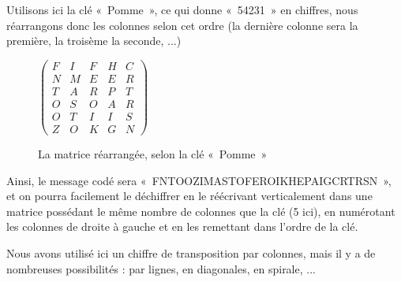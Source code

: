 Utilisons ici la clé «~Pomme~», ce qui donne «~54231~» en chiffres,
nous réarrangons donc les colonnes selon cet ordre (la dernière
colonne sera la première, la troisème la seconde, ...)

\begin{figure}[h]
  \begin{center}
  $
  \left(
    \begin{array}{ccccc}
      F & I & F & H & C \\ 
      N & M & E & E & R \\
      T & A & R & P & T \\
      O & S & O & A & R \\
      O & T & I & I & S \\
      Z & O & K & G & N
    \end{array}
  \right)
  $
  \end{center}
  \caption{La matrice réarrangée, selon la clé «~Pomme~»}
  \label{fig:TranspositionMatriceCode}
\end{figure}

Ainsi, le message codé sera «~FNTOOZIMASTOFEROIKHEPAIGCRTRSN~», et on
pourra facilement le déchiffrer en le réécrivant verticalement dans
une matrice possédant le même nombre de colonnes que la clé (5 ici),
en numérotant les colonnes de droite à gauche et en les remettant dans
l'ordre de la clé.

Nous avons utilisé ici un chiffre de transposition par colonnes, mais
il y a de nombreuses possibilités : par lignes, en diagonales, en
spirale, ...
